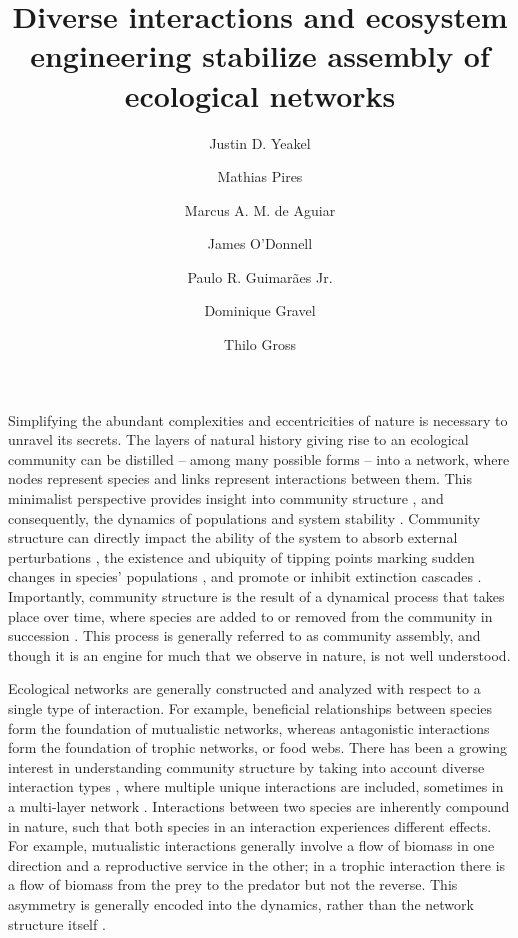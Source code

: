 \documentclass[9pt,twocolumn,twoside]{pnas-new}
\title{Diverse interactions and ecosystem engineering stabilize assembly of ecological networks}
\author[a,b]{Justin D. Yeakel}
\author[c]{Mathias Pires}
\author[c]{Marcus A. M. de Aguiar}
\author[d]{James O'Donnell}
\author[e]{Paulo R. Guimar\~aes Jr.}
\author[f]{Dominique Gravel}
\author[g]{Thilo Gross}
\affil[a]{School of Natural Sciences, University of California Merced, Merced, CA 95343, USA}
\affil[b]{Santa Fe Institute}
\affil[c]{Universidade Estadual de Campinas}
\affil[d]{University of Washington}
\affil[e]{Universidade de S\~ao Paulo}
\affil[f]{Universit\`e de Sherbrooke}
\affil[g]{University of California Davis, Davis CA}
\begin{document}
\verticaladjustment{-2pt}

\maketitle
\thispagestyle{firststyle}


Simplifying the abundant complexities and eccentricities of nature is necessary to unravel its secrets.
The layers of natural history giving rise to an ecological community can be distilled -- among many possible forms -- into a network, where nodes represent species and links represent interactions between them.
This minimalist perspective provides insight into community structure \cite{Dunne2002,Pascual2006}, and consequently, the dynamics of populations and system stability \cite{May1972,Gross2009,Allesina2012}.
Community structure can directly impact the ability of the system to absorb external perturbations \cite{Novak2011,Aufderheide2013,Novak2016}, the existence and ubiquity of tipping points marking sudden changes in species' populations \cite{Lade2011,Boettiger2012}, and promote or inhibit extinction cascades \cite{Stouffer2011,Yeakel2014}.
Importantly, community structure is the result of a dynamical process that takes place over time, where species are added to or removed from the community in succession \cite{Weiher2001}.
This process is generally referred to as community assembly, and though it is an engine for much that we observe in nature, is not well understood.

Ecological networks are generally constructed and analyzed with respect to a single type of interaction.
For example, beneficial relationships between species form the foundation of mutualistic networks, whereas antagonistic interactions form the foundation of trophic networks, or food webs. %
There has been a growing interest in understanding community structure by taking into account diverse interaction types \cite{Kefi2016}, where multiple unique interactions are included, sometimes in a multi-layer network \cite{Pilosof2017}.
Interactions between two species are inherently compound in nature, such that both species in an interaction experiences different effects.
For example, mutualistic interactions generally involve a flow of biomass in one direction and a reproductive service in the other; in a trophic interaction there is a flow of biomass from the prey to the predator but not the reverse.
This asymmetry is generally encoded into the dynamics, rather than the network structure itself \cite{Gross2009,Allesina2012}.
\end{document}
